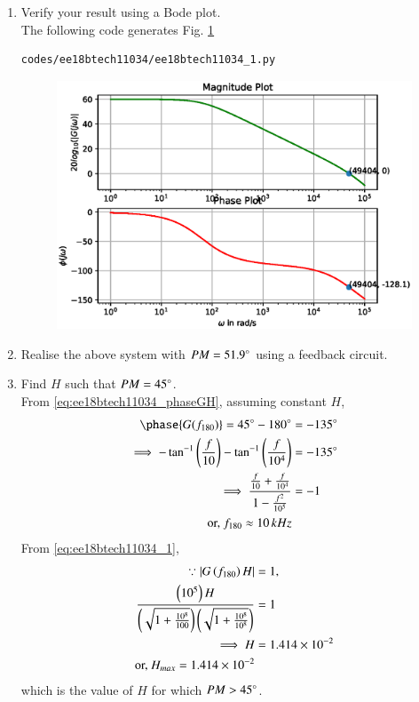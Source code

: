 \begin{enumerate}[label=\arabic*.,ref=\theenumi]
\item Verify your result using a Bode plot.
\\
\solution  The following code  generates Fig. \ref{fig:ee18btech11034_1}

\begin{lstlisting}
codes/ee18btech11034/ee18btech11034_1.py
\end{lstlisting}
%
\begin{figure}[!h]
\centering
\includegraphics[width=\columnwidth]{./figs/ee18btech11034/ee18btech11034_1.eps}
\caption{}
\label{fig:ee18btech11034_1}
\end{figure}
%
\item Realise the above system with $PM = 51.9 \degree$ using a feedback circuit.
\item Find $H$ such that $PM = 45\degree$.
\\
\solution From \eqref{eq:ee18btech11034_phaseGH},
assuming constant $H$,
\begin{align}
\phase{G(f_{180})} = 45\degree - 180 \degree &=  -135\degree
\\
\implies -\tan^{-1}\brak{\frac{f}{10}} -\tan^{-1}\brak{\frac{f}{10^{4}}}  &= -135\degree
\\
\implies     \frac{\frac{f}{10} + \frac{f}{10^{4}}}{1-\frac{f^2}{10^{5}}} &= -1
\\
\text{or, }    f_{180} \approx 10 \, kHz
\end{align}
From \eqref{eq:ee18btech11034_1},
\begin{align}
\because  \left\vert G\left(f_{180}\right)H\right\vert&=1,
\\
  \frac{\left(10^{5}\right)H}{\left(\sqrt{1+\frac{10^{8}}{100}}\right)\left(\sqrt{1+\frac{10^{8}}{10^{8}}}\right)} &= 1
\\
\implies     H &= 1.414 \times 10^{-2}
    \\
  \text{or, }  H_{max} =  1.414 \times 10^{-2}
\end{align}
which is the value of $H$ for which $PM > 45\degree$.


\end{enumerate}
